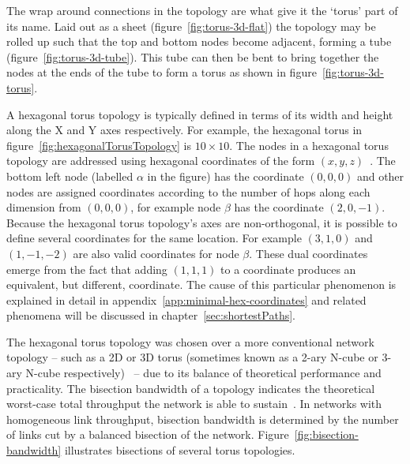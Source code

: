 		The wrap around connections in the topology are what give it the `torus'
		part of its name. Laid out as a sheet (figure~\ref{fig:torus-3d-flat}) the
		topology may be rolled up such that the top and bottom nodes become
		adjacent, forming a tube (figure~\ref{fig:torus-3d-tube}). This tube can
		then be bent to bring together the nodes at the ends of the tube to form a
		torus as shown in figure~\ref{fig:torus-3d-torus}.
		
		A hexagonal torus topology is typically defined in terms of its width and
		height along the X and Y axes respectively. For example, the hexagonal
		torus in figure~\ref{fig:hexagonalTorusTopology} is $10\times10$.  The
		nodes in a hexagonal torus topology are addressed using hexagonal
		coordinates of the form $(x, y, z)$~\cite{patel15}. The bottom left node
		(labelled $\alpha$ in the figure) has the coordinate $(0, 0, 0)$ and other
		nodes are assigned coordinates according to the number of hops along each
		dimension from $(0, 0, 0)$, for example node $\beta$ has the coordinate
		$(2, 0, -1)$. Because the hexagonal torus topology's axes are
		non-orthogonal, it is possible to define several coordinates for the same
		location. For example $(3, 1, 0)$ and $(1, -1, -2)$ are also valid
		coordinates for node $\beta$. These dual coordinates emerge from the fact
		that adding $(1, 1, 1)$ to a coordinate produces an equivalent, but
		different, coordinate. The cause of this particular phenomenon is explained
		in detail in appendix~\ref{app:minimal-hex-coordinates} and related
		phenomena will be discussed in chapter~\ref{sec:shortestPaths}.
		
		The hexagonal torus topology was chosen over a more conventional network
		topology -- such as a 2D or 3D torus (sometimes known as a 2-ary N-cube or
		3-ary N-cube respectively)~\cite[chapters~3~and~5]{dally04} -- due to its
		balance of theoretical performance and practicality. The bisection
		bandwidth of a topology indicates the theoretical worst-case total
		throughput the network is able to sustain~\cite[chapter~1]{dally04}.  In
		networks with homogeneous link throughput, bisection bandwidth is
		determined by the number of links cut by a balanced bisection of the
		network.  Figure~\ref{fig:bisection-bandwidth} illustrates bisections of
		several torus topologies.
		

